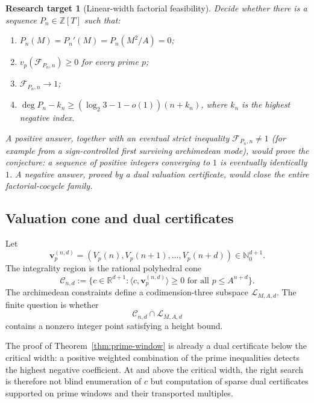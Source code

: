 \documentclass[11pt,oneside]{article}
\newtheorem{target}[theorem]{Research target}
\theoremstyle{definition}
\theoremstyle{remark}
\newcommand{\Nzero}{\mathbb N_0}
\newcommand{\Z}{\mathbb Z}
\newcommand{\R}{\mathbb R}
\newcommand{\cF}{\mathcal F}
\begin{document}
\begin{target}[Linear-width factorial feasibility]
\label{target:linear-width}
Decide whether there is a sequence $P_n\in\Z[T]$ such that:
\begin{enumerate}
\item $P_n(M)=P_n'(M)=P_n(M^2/A)=0$;
\item $v_p(\cF_{P_n,n})\ge0$ for every prime $p$;
\item $\cF_{P_n,n}\to1$;
\item $\deg P_n-k_n\ge(\log_2 3-1-o(1))(n+k_n)$, where $k_n$ is the highest negative index.
\end{enumerate}
A positive answer, together with an eventual strict inequality
$\cF_{P_n,n}\ne1$ (for example from a sign-controlled first surviving archimedean mode),
would prove the conjecture: a sequence of positive integers converging to $1$ is eventually
identically $1$.  A negative answer, proved by a dual valuation certificate, would close the
entire factorial-cocycle family.
\end{target}

\subsection{Valuation cone and dual certificates}

Let
\begin{equation}
 \mathbf v_p^{(n,d)}=(V_p(n),V_p(n+1),\ldots,V_p(n+d))\in\Nzero^{d+1}.
 \label{eq:valuation-vector}
\end{equation}
The integrality region is the rational polyhedral cone
\begin{equation}
 \mathcal C_{n,d}:=
 \{c\in\R^{d+1}:\langle c,\mathbf v_p^{(n,d)}\rangle\ge0
 \text{ for all }p\le A^{n+d}\}.
 \label{eq:valuation-cone}
\end{equation}
The archimedean constraints define a codimension-three subspace
$\mathcal L_{M,A,d}$.  The finite question is whether
\begin{equation}
 \mathcal C_{n,d}\cap\mathcal L_{M,A,d}
 \label{eq:cone-intersection}
\end{equation}
contains a nonzero integer point satisfying a height bound.

The proof of Theorem~\ref{thm:prime-window} is already a dual certificate below the critical
width: a positive weighted combination of the prime inequalities detects the highest
negative coefficient.  At and above the critical width, the right search is therefore not
blind enumeration of $c$ but computation of sparse dual certificates supported on prime
windows and their transported multiples.
\end{document}
